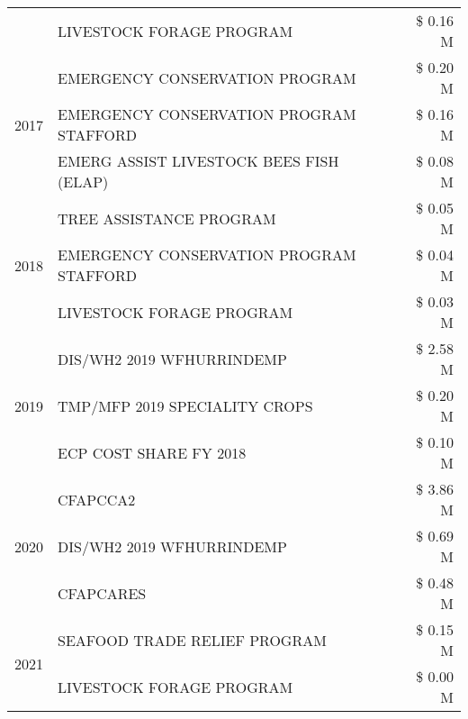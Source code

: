 \begin{tabular}{llr}
 & LIVESTOCK FORAGE PROGRAM                      & \$ 0.16 M \\
\cline{1-3}
\multirow[t]{3}{*}{2017} & EMERGENCY CONSERVATION PROGRAM & \$ 0.20 M \\
 & EMERGENCY CONSERVATION PROGRAM STAFFORD & \$ 0.16 M \\
 & EMERG ASSIST LIVESTOCK BEES FISH (ELAP) & \$ 0.08 M \\
\cline{1-3}
\multirow[t]{3}{*}{2018} & TREE ASSISTANCE PROGRAM & \$ 0.05 M \\
 & EMERGENCY CONSERVATION PROGRAM STAFFORD & \$ 0.04 M \\
 & LIVESTOCK FORAGE PROGRAM & \$ 0.03 M \\
\cline{1-3}
\multirow[t]{3}{*}{2019} & DIS/WH2 2019 WFHURRINDEMP & \$ 2.58 M \\
 & TMP/MFP 2019 SPECIALITY CROPS & \$ 0.20 M \\
 & ECP COST SHARE FY 2018 & \$ 0.10 M \\
\cline{1-3}
\multirow[t]{3}{*}{2020} & CFAPCCA2 & \$ 3.86 M \\
 & DIS/WH2 2019 WFHURRINDEMP & \$ 0.69 M \\
 & CFAPCARES & \$ 0.48 M \\
\cline{1-3}
\multirow[t]{2}{*}{2021} & SEAFOOD TRADE RELIEF PROGRAM & \$ 0.15 M \\
 & LIVESTOCK FORAGE PROGRAM & \$ 0.00 M \\
\cline{1-3}
\bottomrule
\end{tabular}
